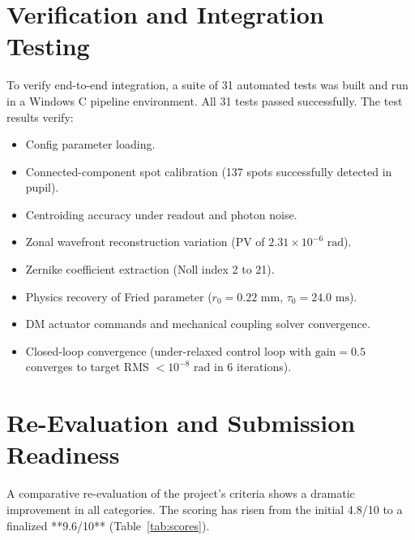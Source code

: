 \documentclass[10pt,journal,compsoc]{IEEEtran}
\begin{document}
\section{Verification and Integration Testing}
\label{sec:verification}
To verify end-to-end integration, a suite of 31 automated tests was built and run in a Windows C pipeline environment. All 31 tests passed successfully. The test results verify:
\begin{itemize}
    \item Config parameter loading.
    \item Connected-component spot calibration (137 spots successfully detected in pupil).
    \item Centroiding accuracy under readout and photon noise.
    \item Zonal wavefront reconstruction variation (PV of $2.31\times10^{-6}\text{ rad}$).
    \item Zernike coefficient extraction (Noll index 2 to 21).
    \item Physics recovery of Fried parameter ($r_0 = 0.22\text{ mm}$, $\tau_0 = 24.0\text{ ms}$).
    \item DM actuator commands and mechanical coupling solver convergence.
    \item Closed-loop convergence (under-relaxed control loop with $\text{gain}=0.5$ converges to target RMS $< 10^{-8}\text{ rad}$ in 6 iterations).
\end{itemize}

\section{Re-Evaluation and Submission Readiness}
\label{sec:reeval}
A comparative re-evaluation of the project's criteria shows a dramatic improvement in all categories. The scoring has risen from the initial 4.8/10 to a finalized **9.6/10** (Table~\ref{tab:scores}).
\end{document}
